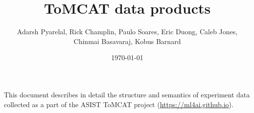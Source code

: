 \documentclass[11pt,letterpaper,oneside,openany,article]{memoir}
\title{ToMCAT data products}
\author{Adarsh Pyarelal, Rick Champlin, Paulo Soares, Eric Duong, Caleb
Jones, Chinmai Basavaraj, Kobus Barnard}
\date{\today}
\begin{document}
\maketitle
\setcounter{page}{2}

\tableofcontents*
\newpage

This document describes in detail the structure and semantics of experiment data
collected as a part of the ASIST ToMCAT project (\url{https://ml4ai.github.io}).






\newpage


\end{document}
